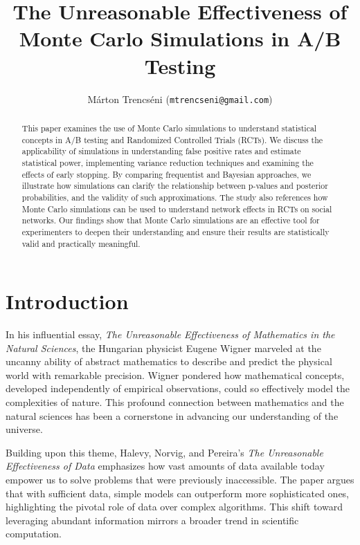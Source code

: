 \documentclass[final,5p,times,twocolumn,authoryear]{elsarticle}
\begin{document}
\begin{frontmatter}

\title{The Unreasonable Effectiveness of Monte Carlo Simulations in A/B Testing}

\author{Márton Trencséni (\texttt{mtrencseni@gmail.com})}

\begin{abstract}
This paper examines the use of Monte Carlo simulations to understand statistical concepts in A/B testing and Randomized Controlled Trials (RCTs). We discuss the applicability of simulations in understanding false positive rates and estimate statistical power, implementing variance reduction techniques and examining the effects of early stopping. By comparing frequentist and Bayesian approaches, we illustrate how simulations can clarify the relationship between p-values and posterior probabilities, and the validity of such approximations. The study also references how Monte Carlo simulations can be used to understand network effects in RCTs on social networks. Our findings show that Monte Carlo simulations are an effective tool for experimenters to deepen their understanding and ensure their results are statistically valid and practically meaningful.

\end{abstract}

\end{frontmatter}

\section{Introduction}

In his influential essay, \textit{The Unreasonable Effectiveness of Mathematics in the Natural Sciences}, the Hungarian physicist Eugene Wigner marveled at the uncanny ability of abstract mathematics to describe and predict the physical world with remarkable precision. Wigner pondered how mathematical concepts, developed independently of empirical observations, could so effectively model the complexities of nature. This profound connection between mathematics and the natural sciences has been a cornerstone in advancing our understanding of the universe.

Building upon this theme, Halevy, Norvig, and Pereira's \textit{The Unreasonable Effectiveness of Data} emphasizes how vast amounts of data available today empower us to solve problems that were previously inaccessible. The paper argues that with sufficient data, simple models can outperform more sophisticated ones, highlighting the pivotal role of data over complex algorithms. This shift toward leveraging abundant information mirrors a broader trend in scientific computation.
\end{document}
